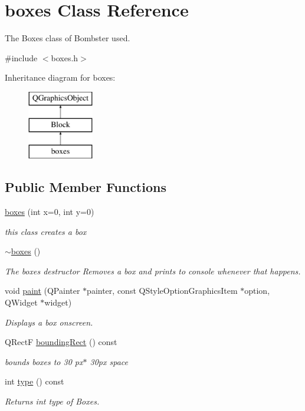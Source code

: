 \hypertarget{classboxes}{\section{boxes Class Reference}
\label{classboxes}
}


The Boxes class of Bombster used.  




{\ttfamily \#include $<$boxes.\-h$>$}

Inheritance diagram for boxes\-:\begin{figure}[H]
\begin{center}
\leavevmode
\includegraphics[height=3.000000cm]{classboxes}
\end{center}
\end{figure}
\subsection*{Public Member Functions}
\begin{DoxyCompactItemize}
\item 
\hyperlink{classboxes_a093427b27f4b84a803544cb738dc12e6}{boxes} (int x=0, int y=0)
\begin{DoxyCompactList}\small\item\em this class creates a box \end{DoxyCompactList}\item 
\hyperlink{classboxes_a7d70921b4fe775ad313ac80d6da55222}{$\sim$boxes} ()
\begin{DoxyCompactList}\small\item\em The boxes destructor Removes a box and prints to console whenever that happens. \end{DoxyCompactList}\item 
void \hyperlink{classboxes_aa07b0460f8be5da676c4369331061fa6}{paint} (Q\-Painter $\ast$painter, const Q\-Style\-Option\-Graphics\-Item $\ast$option, Q\-Widget $\ast$widget)
\begin{DoxyCompactList}\small\item\em Displays a box onscreen. \end{DoxyCompactList}\item 
Q\-Rect\-F \hyperlink{classboxes_a4855400f92db9ebe776a79c79bac1d50}{bounding\-Rect} () const 
\begin{DoxyCompactList}\small\item\em bounds boxes to 30 px$\ast$ 30px space \end{DoxyCompactList}\item 
int \hyperlink{classboxes_abc3e99501e6d9108c0fa115214b0e14e}{type} () const 
\begin{DoxyCompactList}\small\item\em Returns int type of Boxes. \end{DoxyCompactList}\end{DoxyCompactItemize}
